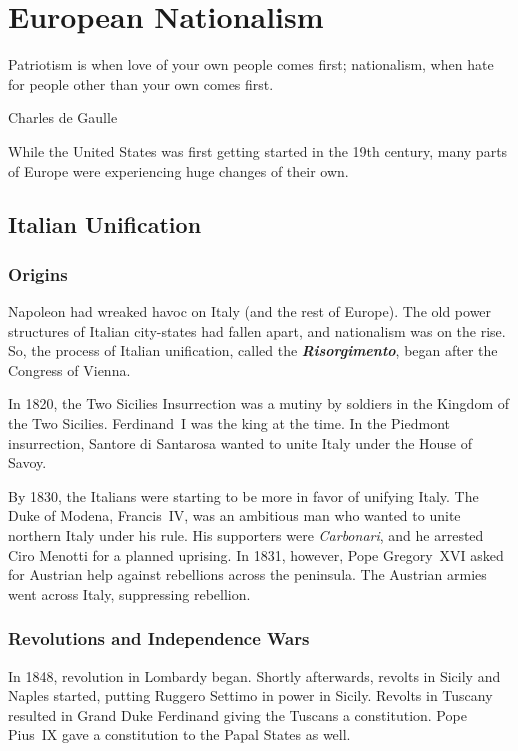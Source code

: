 \chapter{European Nationalism}

\epigraph{%
  Patriotism is when love of your own people comes first;
  nationalism, when hate for people other than your own comes first.
}{Charles de Gaulle}

While the United States was first getting started in the 19th century,
many parts of Europe were experiencing huge changes of their own.

\section{Italian Unification}

\subsection*{Origins}

Napoleon had wreaked havoc on Italy (and the rest of Europe).
The old power structures of Italian city-states had fallen apart, and nationalism was on the rise.
So, the process of Italian unification, called the \textbf{\textit{Risorgimento}}, began after the Congress of Vienna.

In 1820, the Two Sicilies Insurrection was a mutiny by soldiers in the Kingdom of the Two Sicilies.
Ferdinand~I was the king at the time.
In the Piedmont insurrection, Santore di Santarosa wanted to unite Italy under the House of Savoy.

By 1830, the Italians were starting to be more in favor of unifying Italy.
The Duke of Modena, Francis~IV, was an ambitious man who wanted to unite northern Italy under his rule.
His supporters were \textit{Carbonari}, and he arrested Ciro Menotti for a planned uprising.
In 1831, however, Pope Gregory~XVI asked for Austrian help against rebellions across the peninsula.
The Austrian armies went across Italy, suppressing rebellion.

\subsection*{Revolutions and Independence Wars}

In 1848, revolution in Lombardy began.
Shortly afterwards, revolts in Sicily and Naples started, putting Ruggero Settimo in power in Sicily.
Revolts in Tuscany resulted in Grand Duke Ferdinand giving the Tuscans a constitution.
Pope Pius~IX gave a constitution to the Papal States as well.

